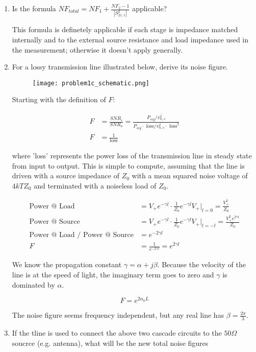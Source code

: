 \begin{enumerate}[label=(\alph*)]
    \item {\color{blue} Is the formula $NF_{total} = NF_1 + \frac{NF_2-1}{|S_{21,1}^2|}$ applicable?}

    This formula is definetely applicable if each stage is impedance matched internally and to the external source resistance and load impedance used in the measurement; otherwise it doesn't apply generally.

    \item {\color{blue} For a lossy transmission line illustrated below, derive its noise figure.}

    \begin{figure}[H]
        \centering \texttt{[image: problem1c\_schematic.png]}
    \end{figure}

    Starting with the definition of $F$:

    \begin{align*}
        F &= \frac{SNR_i}{SNR_o} = \frac{P_{sig}/\overline{v_{n,s}^2}}{P_{sig} \cdot \text{ loss} / \overline{v_{n,s}^2} \cdot \text{ loss}^2} \\
        F &= \frac{1}{\text{loss}}
    \end{align*}

    where 'loss' represents the power loss of the transmission line in steady state from input to output. This is simple to compute, assuming that the line is driven with a source impedance of $Z_0$ with a mean squared noise voltage of $4 kT Z_0$ and terminated with a noiseless load of $Z_0$.

    \begin{align*}
        \text{Power @ Load} &= V_+ e^{-\gamma l} \cdot \frac{1}{Z_0} e^{-\gamma l} V_+ \rvert_{l=0} = \frac{V_+^2}{Z_0} \\
        \text{Power @ Source} &= V_+ e^{-\gamma l} \cdot \frac{1}{Z_0} e^{-\gamma l} V_+ \rvert_{l=-l} = \frac{V_+^2 e^{2 \gamma l}}{Z_0} \\
        \text{Power @ Load / Power @ Source} &= e^{-2 \gamma l} \\
        F &= \frac{1}{e^{-2 \gamma l}} = e^{2 \gamma l}
    \end{align*}

    We know the propagation constant $\gamma = \alpha + j \beta$. Because the velocity of the line is at the speed of light, the imaginary term goes to zero and $\gamma$ is dominated by $\alpha$.

    $$ F = e^{2 \alpha_0 L} $$

    The noise figure seems frequency independent, but any real line has $\beta = \frac{2\pi}{\lambda}$.

    \item {\color{blue} If the tline is used to connect the above two cascade circuits to the $50\Omega$ soucrce (e.g. antenna), what will be the new total noise figures}
\end{enumerate}

